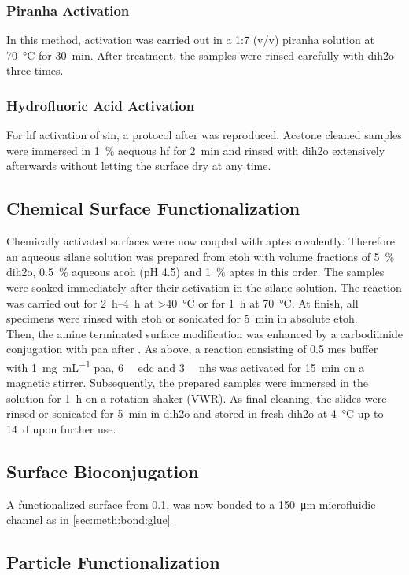 \subsubsection{Piranha Activation}
In this method, activation was carried out in a 1:7 (v/v) piranha solution at \SI{70}{\degreeCelsius} for \SI{30}{\minute}. After treatment, the samples were rinsed carefully with \gls{dih2o} three times.
\subsubsection{Hydrofluoric Acid Activation}
For \gls{hf} activation of \gls{sin}, a protocol after \citet{lit:chem:sin:surfacEtchingandMod} was reproduced. Acetone cleaned samples were immersed in \SI{1}{\percent} aequous \gls{hf} for \SI{2}{\minute} and rinsed with \gls{dih2o} extensively afterwards without letting the surface dry at any time.

\subsection{Chemical Surface Functionalization}
\label{sec:meth:surfFunc}
Chemically activated surfaces were now coupled with \gls{aptes} covalently. Therefore an aqueous silane solution was prepared from \gls{etoh} with volume fractions of \SI{5}{\percent} \gls{dih2o}, \SI{0.5}{\percent} aqueous \gls{acoh} (pH 4.5) and \SI{1}{\percent} \gls{aptes} in this order. The samples were soaked immediately after their activation in the silane solution. The reaction was carried out for \SIrange{2}{4}{\hour} at \SI{>40}{\degreeCelsius} or for \SI{1}{\hour} at \SI{70}{\degreeCelsius}. At finish, all specimens were rinsed with \gls{etoh} or sonicated for \SI{5}{\minute} in absolute \gls{etoh}.\\
Then, the amine terminated surface modification was enhanced by a carbodiimide conjugation with \gls{paa} after \citet{lit:Anti-EpCAM-PAA}. As above, a reaction consisting of \SI{0.5}{\molar} \gls{mes} buffer with \SI{1}{\milli\gram\per\milli\liter} \gls{paa}, \SI{6}{\milli\molar} \gls{edc} and  \SI{3}{\milli\molar} \gls{nhs} was activated for \SI{15}{\minute} on a magnetic stirrer. Subsequently, the prepared samples were immersed in the solution for \SI{1}{\hour} on a rotation shaker (VWR). As final cleaning, the slides were rinsed or sonicated for \SI{5}{\minute} in \gls{dih2o} and stored in fresh \gls{dih2o} at \SI{4}{\degreeCelsius} up to \SI{14}{\day} upon further use.

\subsection{Surface Bioconjugation}
\label{sec:meth:surfBio}
A functionalized surface from \ref{sec:meth:surfFunc}, was now bonded to a \SI{150}{\micro\meter} microfluidic channel as in \ref{sec:meth:bond:glue}

\subsection{Particle Functionalization}





